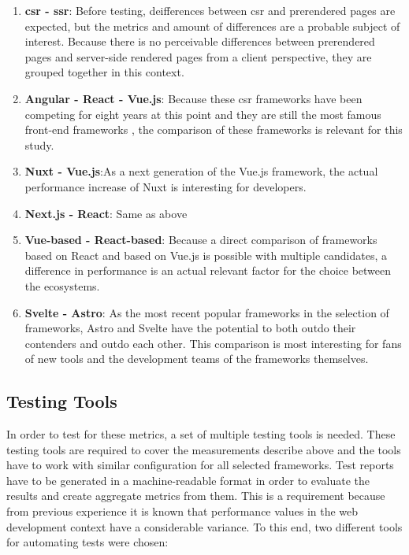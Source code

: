 \documentclass[a4paper, 12pt]{article}
\begin{document}
\begin{enumerate}
  \item \textbf{\acrshort{csr} - \acrshort{ssr}}: Before testing, deifferences between \acrshort{csr} and prerendered pages are expected, but the metrics and amount of differences are a probable subject of interest.
  Because there is no perceivable differences between prerendered  pages and server-side rendered pages from a client perspective, they are grouped together in this context.
  \item \textbf{Angular - React - Vue.js}: Because these \acrshort{csr} frameworks have been competing for eight years at this point and they are still the most famous front-end frameworks \citep{stateOfJs2023}, the comparison of these frameworks is relevant for this study.
  \item \textbf{Nuxt - Vue.js}:As a next generation of the Vue.js framework, the actual performance increase of Nuxt is interesting for developers.
  \item \textbf{Next.js - React}: Same as above
  \item \textbf{Vue-based - React-based}: Because a direct comparison of frameworks based on React and based on Vue.js is possible with multiple candidates, a difference in performance is an actual relevant factor for the choice between the ecosystems.
  \item \textbf{Svelte - Astro}: As the most recent popular frameworks in the selection of frameworks, Astro and Svelte have the potential to both outdo their contenders and outdo each other.
  This comparison is most interesting for fans of new tools and the development teams of the frameworks themselves.
\end{enumerate}

\subsection{Testing Tools}\label{subsec:testingtools}
% 
% 

In order to test for these metrics, a set of multiple testing tools is needed.
These testing tools are required to cover the measurements describe above and the tools have to work with similar configuration for all selected frameworks.
Test reports have to be generated in a machine-readable format in order to evaluate the results and create aggregate metrics from them.
This is a requirement because from previous experience it is known that performance values in the web development context have a considerable variance.
To this end, two different tools for automating tests were chosen:
\end{document}
